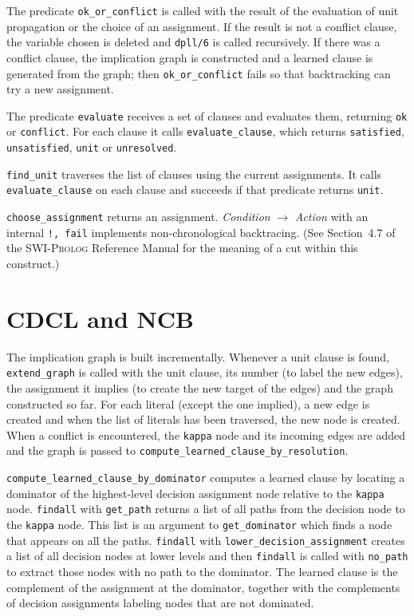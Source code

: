 \documentclass[11pt]{report}
\newcommand*{\p}[1]{\textup{\texttt{#1}}}
\newcommand*{\sw}{\textsc{SWI-Prolog}}
\begin{document}
The predicate \p{ok\_or\_conflict} is called with the result of the
evaluation of unit propagation or the choice of an assignment. If the
result is not a conflict clause, the variable chosen is deleted and
\p{dpll/6} is called recursively. If there was a conflict clause, the
implication graph is constructed and a learned clause is generated from
the graph; then \p{ok\_or\_conflict} fails so that backtracking can try
a new assignment.

The predicate \p{evaluate} receives a set of clauses and evaluates them,
returning \p{ok} or \p{conflict}. For each clause it calls
\p{evaluate\_clause}, which returns \p{satisfied}, \p{unsatisfied},
\p{unit} or \p{unresolved}.

\p{find\_unit} traverses the list of clauses using the current
assignments. It calls \p{evaluate\_clause} on each clause and succeeds
if that predicate returns \p{unit}.

\p{choose\_assignment} returns an assignment. \emph{Condition}
$\rightarrow$ \emph{Action} with an internal \p{!, fail} implements
non-chronological backtracing. (See Section~4.7 of the \sw{} Reference
Manual for the meaning of a cut within this construct.)


\section{CDCL and NCB}

The implication graph is built incrementally. Whenever a unit clause is
found, \p{extend\_graph} is called with the unit clause, its number (to
label the new edges), the assignment it implies (to create the new
target of the edges) and the graph constructed so far. For each literal
(except the one implied), a new edge is created and when the list of
literals has been traversed, the new node is created. When a conflict is
encountered, the \p{kappa} node and its incoming edges are added and the
graph is passed to \p{compute\_learned\_clause\_by\_resolution}.

\p{compute\_learned\_clause\_by\_dominator} computes a learned clause by
locating a dominator of the highest-level decision assignment node
relative to the \p{kappa} node. \p{findall} with \p{get\_path} returns a
list of all paths from the decision node to the \p{kappa} node. This
list is an argument to \p{get\_dominator} which finds a node that
appears on all the paths. \p{findall} with
\p{lower\_decision\_assignment} creates a list of all decision nodes at
lower levels and then \p{findall} is called with \p{no\_path} to extract
those nodes with no path to the dominator. The learned clause is the
complement of the assignment at the dominator, together with the
complements of decision assignments labeling nodes that are not
dominated.
\end{document}
